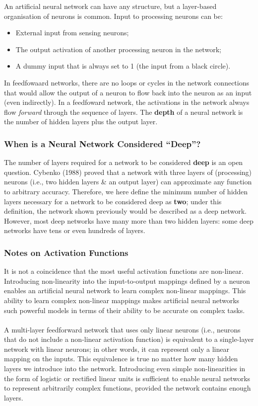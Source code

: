 \documentclass[a4paper,11pt]{article}
\begin{document}
An artificial neural network can have any structure, but a layer-based organisation of neurons is common.
Input to processing neurons can be:
\begin{itemize}
    \item   External input from sensing neurons;
    \item   The output activation of another processing neuron in the network;
    \item   A dummy input that is always set to 1 (the input from a black circle).
\end{itemize}

In feedfowaard networks, there are no loops or cycles in the network connections that would allow the output of a neuron to flow back into the neuron as an input (even indirectly).
In a feedfoward network, the activations in the network always flow \textit{forward} through the sequence of layers.
The \textbf{depth} of a neural network is the number of hidden layers plus the output layer.

\subsubsection{When is a Neural Network Considered ``Deep''?}
The number of layers required for a network to be considered \textbf{deep} is an open question.
Cybenko (1988) proved that a network with three layers of (processing) neurons (i.e., two hidden layers \& an output layer) can approximate any function to arbitrary accuracy.
Therefore, we here define the minimum number of hidden layers necessary for a network to be considered deep as \textbf{two}; under this definition, the network shown previously would be described as a deep network.
However, most deep networks have many more than two hidden layers: some deep networks have tens or even hundreds of layers.

\subsubsection{Notes on Activation Functions}
It is not a coincidence that the most useful activation functions are non-linear.
Introducing non-linearity into the input-to-output mappings defined by a neuron enables an artificial neural network to learn complex non-linear mappings.
This ability to learn complex non-linear mappings makes artificial neural networks such powerful models in terms of their ability to be accurate on complex tasks.
\\\\
A multi-layer feedforward network that uses only linear neurons (i.e., neurons that do not include a non-linear activation function) is equivalent to a single-layer network with linear neurons;
in other words, it can represent only a linear mapping on the inputs.
This equivalence is true no matter how many hidden layers we introduce into the network.
Introducing even simple non-linearities in the form of logistic or rectified linear units is sufficient to enable neural networks to represent arbitrarily complex functions, provided the network contains enough layers.
\end{document}

